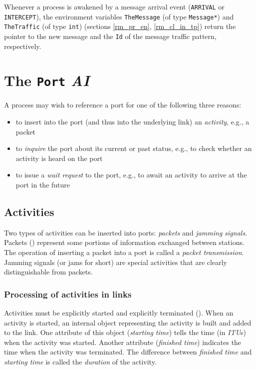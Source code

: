 Whenever a process is
awakened by a message arrival event ({\tt ARRIVAL} or {\tt INTERCEPT}),
the environment variables
{\tt TheMessage} (of type {\tt Message*}) and {\tt TheTraffic}
(of type {\tt int})
(sections \ref{rm_pr_en}, \ref{rm_cl_in_tp})
return the pointer to the new message
and the {\tt Id} of the message traffic pattern, respectively.


\section{The {\tt Port} {\em AI\/}}
\label{rm_po}

A process may wish to reference a port for one of the following three reasons:
\begin{itemize}
\item
to insert into the port (and thus into the underlying link) an {\em activity},
e.g., a packet
\item
to {\em inquire\/} the port about its current or past status, e.g., to
check whether an activity is heard on the port
\item
to issue a {\em wait request\/} to the port, e.g., to await an activity to
arrive at the port in the future
\end{itemize}

\subsection{Activities}
\label{rm_po_ac}

Two types of activities can be inserted into ports:
{\em packets\/} and {\em jamming signals}.
Packets () represent some portions of information exchanged
between stations.
The operation of inserting a packet into a port is called a
{\em packet transmission}.
Jamming signals (or jams for short) are special activities that are
clearly distinguishable from packets.

\subsubsection{Processing of activities in links}
\label{rm_po_ac_pr}

Activities must be explicitly started
and explicitly terminated ().
When an activity is started, an internal object representing the activity
is built and added to the link.
One attribute of this object ({\em starting time\/})
tells the time (in {\em ITU\/}s) when the activity was started.
Another attribute ({\em finished time\/})
indicates the time when the activity was terminated.
The difference between {\em finished time\/} and {\em starting time\/} is
called the {\em duration\/} of the activity.

